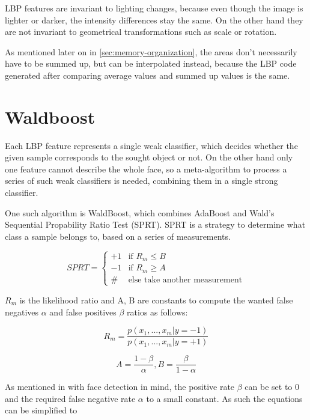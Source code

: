 LBP features are invariant to lighting changes, because even though the image is lighter or darker, the intensity differences stay the same. On the other hand they are not invariant to geometrical transformations such as scale or rotation.

As mentioned later on in \ref{sec:memory-organization}, the areas don't necessarily have to be summed up, but can be interpolated instead, because the LBP code generated after comparing average values and summed up values is the same.

\section{Waldboost}
\label{sec:waldboost}

Each LBP feature represents a single weak classifier, which decides whether the given sample corresponds to the sought object or not. On the other hand only one feature cannot describe the whole face, so a meta-algorithm to process a series of such weak classifiers is needed, combining them in a single strong classifier.

One such algorithm is WaldBoost, which combines AdaBoost and Wald's Sequential Propability Ratio Test (SPRT). SPRT is a strategy to determine what class a sample belongs to, based on a series of measurements.

\[
 SPRT =
  \begin{cases}
   +1 & \text{if } R_{m} \leq B \\
   -1 & \text{if } R_{m} \geq A \\
   \# & \text{else take another measurement} 
  \end{cases}
\]

$R_{m}$ is the likelihood ratio and A, B are constants to compute the wanted false negatives $\alpha$ and false positives $\beta$ ratios as follows:

\begin{equation}
R_{m}=\frac{p(x_{1}, ..., x_{m}|y=-1)}{p(x_{1}, ..., x_{m}|y=+1)}
\end{equation}

\begin{equation}
A=\frac{1-\beta}{\alpha}, B=\frac{\beta}{1-\alpha}
\end{equation}

As mentioned in \cite{sochman-matas-waldboost} with face detection in mind, the positive rate $\beta$ can be set to 0 and the required false negative rate $\alpha$ to a small constant. As such the equations can be simplified to

